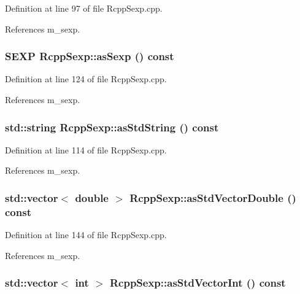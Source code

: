 Definition at line 97 of file RcppSexp.cpp.

References m\_\-sexp.\hypertarget{classRcppSexp_ad55b673427e49062e2f3ec493160d1e3}{
\subsubsection[{asSexp}]{\setlength{\rightskip}{0pt plus 5cm}SEXP RcppSexp::asSexp () const}}
\label{classRcppSexp_ad55b673427e49062e2f3ec493160d1e3}


Definition at line 124 of file RcppSexp.cpp.

References m\_\-sexp.\hypertarget{classRcppSexp_ade685360b8c743411135def23f229911}{
\subsubsection[{asStdString}]{\setlength{\rightskip}{0pt plus 5cm}std::string RcppSexp::asStdString () const}}
\label{classRcppSexp_ade685360b8c743411135def23f229911}


Definition at line 114 of file RcppSexp.cpp.

References m\_\-sexp.\hypertarget{classRcppSexp_a44f99ee7521861aff309dc008b788868}{
\subsubsection[{asStdVectorDouble}]{\setlength{\rightskip}{0pt plus 5cm}std::vector$<$ double $>$ RcppSexp::asStdVectorDouble () const}}
\label{classRcppSexp_a44f99ee7521861aff309dc008b788868}


Definition at line 144 of file RcppSexp.cpp.

References m\_\-sexp.\hypertarget{classRcppSexp_af380f8a164c537a8e99da54660ed5870}{
\subsubsection[{asStdVectorInt}]{\setlength{\rightskip}{0pt plus 5cm}std::vector$<$ int $>$ RcppSexp::asStdVectorInt () const}}
\label{classRcppSexp_af380f8a164c537a8e99da54660ed5870}


